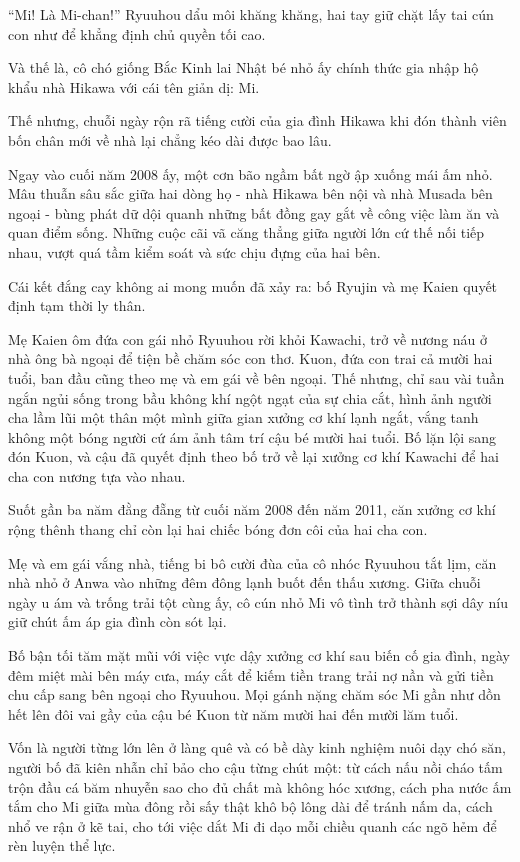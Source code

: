 \documentclass[../main.tex]{subfiles}
\begin{document}
``Mi! Là Mi-chan!'' Ryuuhou dẩu môi khăng khăng, hai tay giữ chặt lấy tai cún con như để khẳng định chủ quyền tối cao.

Và thế là, cô chó giống Bắc Kinh lai Nhật bé nhỏ ấy chính thức gia nhập hộ khẩu nhà Hikawa với cái tên giản dị: Mi.

\ct

Thế nhưng, chuỗi ngày rộn rã tiếng cười của gia đình Hikawa khi đón thành viên bốn chân mới về nhà lại chẳng kéo dài được bao lâu.

Ngay vào cuối năm 2008 ấy, một cơn bão ngầm bất ngờ ập xuống mái ấm nhỏ. Mâu thuẫn sâu sắc giữa hai dòng họ - nhà Hikawa bên nội và nhà Musada bên ngoại - bùng phát dữ dội quanh những bất đồng gay gắt về công việc làm ăn và quan điểm sống. Những cuộc cãi vã căng thẳng giữa người lớn cứ thế nối tiếp nhau, vượt quá tầm kiểm soát và sức chịu đựng của hai bên.

Cái kết đắng cay không ai mong muốn đã xảy ra: bố Ryujin và mẹ Kaien quyết định tạm thời ly thân.

Mẹ Kaien ôm đứa con gái nhỏ Ryuuhou rời khỏi Kawachi, trở về nương náu ở nhà ông bà ngoại để tiện bề chăm sóc con thơ. Kuon, đứa con trai cả mười hai tuổi, ban đầu cũng theo mẹ và em gái về bên ngoại. Thế nhưng, chỉ sau vài tuần ngắn ngủi sống trong bầu không khí ngột ngạt của sự chia cắt, hình ảnh người cha lầm lũi một thân một mình giữa gian xưởng cơ khí lạnh ngắt, vắng tanh không một bóng người cứ ám ảnh tâm trí cậu bé mười hai tuổi. Bố lặn lội sang đón Kuon, và cậu đã quyết định theo bố trở về lại xưởng cơ khí Kawachi để hai cha con nương tựa vào nhau.

Suốt gần ba năm đằng đẵng từ cuối năm 2008 đến năm 2011, căn xưởng cơ khí rộng thênh thang chỉ còn lại hai chiếc bóng đơn côi của hai cha con.

Mẹ và em gái vắng nhà, tiếng bi bô cười đùa của cô nhóc Ryuuhou tắt lịm, căn nhà nhỏ ở Anwa vào những đêm đông lạnh buốt đến thấu xương. Giữa chuỗi ngày u ám và trống trải tột cùng ấy, cô cún nhỏ Mi vô tình trở thành sợi dây níu giữ chút ấm áp gia đình còn sót lại.

Bố bận tối tăm mặt mũi với việc vực dậy xưởng cơ khí sau biến cố gia đình, ngày đêm miệt mài bên máy cưa, máy cắt để kiếm tiền trang trải nợ nần và gửi tiền chu cấp sang bên ngoại cho Ryuuhou. Mọi gánh nặng chăm sóc Mi gần như dồn hết lên đôi vai gầy của cậu bé Kuon từ năm mười hai đến mười lăm tuổi.

Vốn là người từng lớn lên ở làng quê và có bề dày kinh nghiệm nuôi dạy chó săn, người bố đã kiên nhẫn chỉ bảo cho cậu từng chút một: từ cách nấu nồi cháo tấm trộn đầu cá băm nhuyễn sao cho đủ chất mà không hóc xương, cách pha nước ấm tắm cho Mi giữa mùa đông rồi sấy thật khô bộ lông dài để tránh nấm da, cách nhổ ve rận ở kẽ tai, cho tới việc dắt Mi đi dạo mỗi chiều quanh các ngõ hẻm để rèn luyện thể lực.
\end{document}
